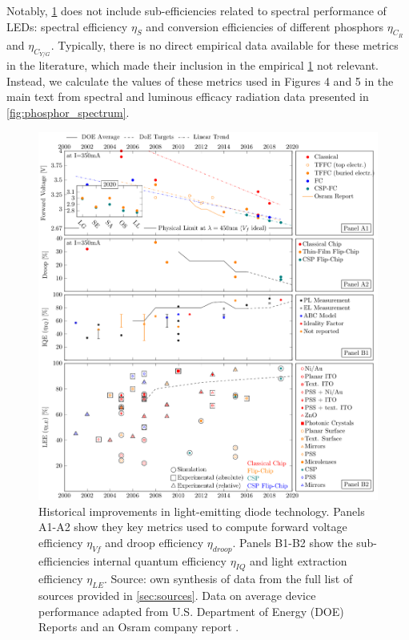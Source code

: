 \documentclass[parskip=full]{article}
\begin{document}
Notably, \cref{fgr:subeff} does not include sub-efficiencies related to spectral performance of LEDs: spectral efficiency $\eta_S$ and conversion efficiencies of different phosphors $\eta_{C_R}$ and $\eta_{C_{Y/G}}$. Typically, there is no direct empirical data available for these metrics in the literature, which made their inclusion in the empirical \cref{fgr:subeff} not relevant. Instead, we calculate the values of these metrics used in Figures 4 and 5 in the main text from spectral and luminous efficacy radiation data presented in \cref{fig:phosphor_spectrum}.

\begin{figure}[h!]
\centering
\includegraphics[width=15.5cm]{./figures/subefficiencies_progress.pdf}
\caption{Historical improvements in light-emitting diode technology. Panels A1-A2 show they key metrics used to compute forward voltage efficiency $\eta_{Vf}$ and droop efficiency $\eta_{droop}$. Panels B1-B2 show the sub-efficiencies internal quantum efficiency $\eta_{IQ}$ and light extraction efficiency $\eta_{LE}$. Source: own synthesis of data from the full list of sources provided in \cref{sec:sources}. Data on average device performance adapted from U.S. Department of Energy (DOE) Reports \cite{doe_ssl_multiyear_2007}\cite{doe_ssl_multiyear_2008}\cite{doe_ssl_multiyear_2013}\cite{doe_ssl_rnd_2016}\cite{doe_ssl_rnd_2018} and an Osram company report \cite{beale_leds_2015}.}
\label{fgr:subeff}
\end{figure}
\end{document}
